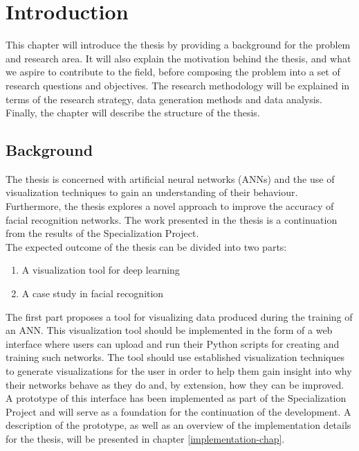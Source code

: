 \chapter{Introduction}

This chapter will introduce the thesis by providing a background for the problem and research area. It will also explain the motivation behind the thesis, and what we aspire to contribute to the field, before composing the problem into a set of research questions and objectives. The research methodology will be explained in terms of the research strategy, data generation methods and data analysis. Finally, the chapter will describe the structure of the thesis.

\section{Background}

\noindent The thesis is concerned with artificial neural networks (ANNs) and the use of visualization techniques to gain an understanding of their behaviour. Furthermore, the thesis explores a novel approach to improve the accuracy of facial recognition networks. The work presented in the thesis is a continuation from the results of the Specialization Project. \\

\noindent The expected outcome of the thesis can be divided into two parts:
\begin{enumerate}
    \item A visualization tool for deep learning
    \item A case study in facial recognition
\end{enumerate}

\noindent The first part proposes a tool for visualizing data produced during the training of an ANN. This visualization tool should be implemented in the form of a web interface where users can upload and run their Python scripts for creating and training such networks. The tool should use established visualization techniques to generate visualizations for the user in order to help them gain insight into why their networks behave as they do and, by extension, how they can be improved. A prototype of this interface has been implemented as part of the Specialization Project and will serve as a foundation for the continuation of the development. A description of the prototype, as well as an overview of the implementation details for the thesis, will be presented in chapter \ref{implementation-chap}. \\

